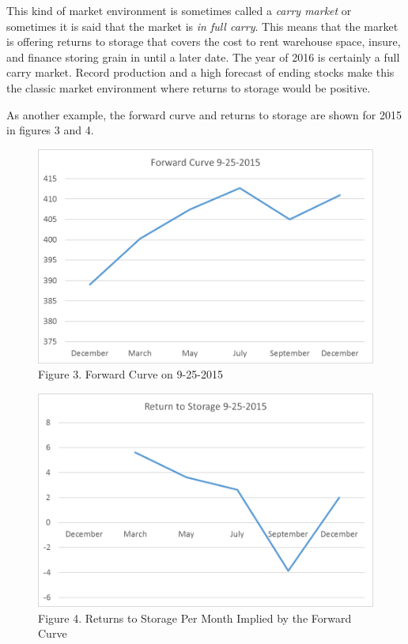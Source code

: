 \documentclass[]{book}
\theoremstyle{definition}
\theoremstyle{definition}
\theoremstyle{remark}
\begin{document}
This kind of market environment is sometimes called a \emph{carry
market} or sometimes it is said that the market is \emph{in full carry}.
This means that the market is offering returns to storage that covers
the cost to rent warehouse space, insure, and finance storing grain in
until a later date. The year of 2016 is certainly a full carry market.
Record production and a high forecast of ending stocks make this the
classic market environment where returns to storage would be positive.

As another example, the forward curve and returns to storage are shown
for 2015 in figures 3 and 4.

\begin{figure}[htbp]
\centering
\includegraphics{Excel-files/PricesSpaceTime/forward-curves_files/image005.png}
\caption{Figure 3. Forward Curve on 9-25-2015}
\end{figure}

\begin{figure}[htbp]
\centering
\includegraphics{Excel-files/PricesSpaceTime/forward-curves_files/image007.png}
\caption{Figure 4. Returns to Storage Per Month Implied by the Forward
Curve}
\end{figure}
\end{document}
